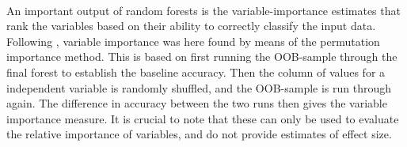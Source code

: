 \documentclass[12pt, a4paper]{article}
\begin{document}
\noindent{}\\ 

An important output of random forests is the variable-importance estimates that rank the variables based on their ability to correctly classify the input data. Following \cite{parr2018}, variable importance was here found by means of the permutation importance method. This is based on first running the OOB-sample through the final forest to establish the baseline accuracy. Then the column of values for a independent variable is randomly shuffled, and the OOB-sample is run through again. The difference in accuracy between the two runs then gives the variable importance measure. It is crucial to note that these can only be used to evaluate the relative importance of variables, and do not provide estimates of effect size. \par
\end{document}
